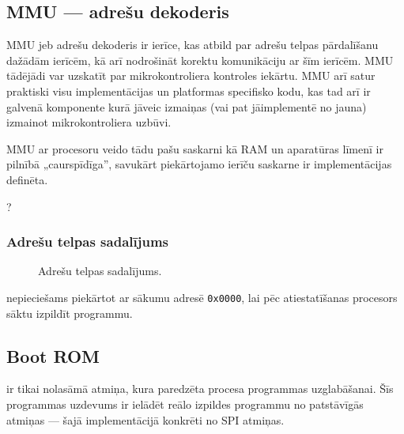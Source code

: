

\subsection{MMU — adrešu dekoderis} \label{sec:mmu}
	MMU jeb adrešu dekoderis ir ierīce, kas atbild par adrešu telpas
	pārdalīšanu dažādām ierīcēm, kā arī nodrošināt korektu komunikāciju
	ar šīm ierīcēm. MMU tādējādi var uzskatīt par mikrokontroliera kontroles
	iekārtu. MMU arī satur praktiski visu implementācijas un platformas
	specifisko kodu, kas tad arī ir galvenā komponente kurā jāveic izmaiņas
	(vai pat jāimplementē no jauna) izmainot mikrokontroliera uzbūvi.
	
	MMU ar procesoru veido tādu pašu saskarni kā RAM un aparatūras
	līmenī ir pilnībā „caurspīdīga”, savukārt piekārtojamo ierīču saskarne
	ir implementācijas definēta.
	
	\todo ?
	
	\subsubsection{Adrešu telpas sadalījums}
	\begin{figure}[thp]
		\centering
		\def\svgwidth{0.75\textwidth}
		{\ttfamily\small}
		\caption{Adrešu telpas sadalījums.}
		\label{fig:memory-map}
	\end{figure}
	
	 nepieciešams piekārtot ar sākumu adresē \texttt{0x0000},
	lai pēc atiestatīšanas procesors sāktu izpildīt  programmu.


\subsection{Boot ROM}
	 ir tikai nolasāmā atmiņa, kura paredzēta
	 procesa programmas uzglabāšanai.
	Šīs programmas uzdevums ir ielādēt reālo izpildes programmu no
	patstāvīgās atmiņas — šajā implementācijā konkrēti 
	no SPI  atmiņas.
	
